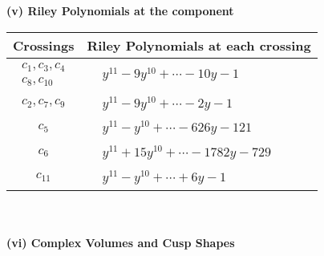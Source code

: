 \documentclass[1p]{elsarticle_modified}
\theoremstyle{definition}
\begin{document}
\newpage\renewcommand{\arraystretch}{1}
\flushleft \textbf{(v) Riley Polynomials at the component}\newline \\
\begin{tabular}{m{50pt}|m{274pt}}
Crossings & \hspace{64pt}Riley Polynomials at each crossing \\
\hline $$\begin{aligned}c_{1},c_{3},c_{4}\\c_{8},c_{10}\end{aligned}$$&$\begin{aligned}
&y^{11}-9 y^{10}+\cdots-10 y-1
\end{aligned}$\\
\hline $$\begin{aligned}c_{2},c_{7},c_{9}\end{aligned}$$&$\begin{aligned}
&y^{11}-9 y^{10}+\cdots-2 y-1
\end{aligned}$\\
\hline $$\begin{aligned}c_{5}\end{aligned}$$&$\begin{aligned}
&y^{11}- y^{10}+\cdots-626 y-121
\end{aligned}$\\
\hline $$\begin{aligned}c_{6}\end{aligned}$$&$\begin{aligned}
&y^{11}+15 y^{10}+\cdots-1782 y-729
\end{aligned}$\\
\hline $$\begin{aligned}c_{11}\end{aligned}$$&$\begin{aligned}
&y^{11}- y^{10}+\cdots+6 y-1
\end{aligned}$\\
\hline
\end{tabular}\\~\\
\newpage\flushleft \textbf{(vi) Complex Volumes and Cusp Shapes}
\end{document}
